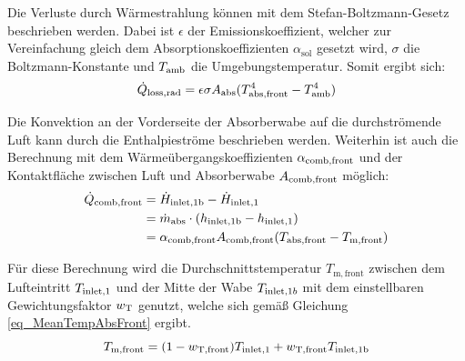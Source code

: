 Die Verluste durch Wärmestrahlung können mit dem Stefan-Boltzmann-Gesetz beschrieben werden.
Dabei ist $\epsilon$ der Emissionskoeffizient, welcher zur Vereinfachung gleich dem Absorptionskoeffizienten $\alpha_{\mathrm{sol}}$ gesetzt wird, $\sigma$ die Boltzmann-Konstante und $T_{\mathrm{amb}}$ die Umgebungstemperatur. Somit ergibt sich:
\begin{equation} \label{eq_StrahlungVerluste}
    \dot{Q}_{\mathrm{loss,rad}} = \epsilon \sigma A_{\mathrm{abs}} (T_{\mathrm{abs,front}}^4-T_{\mathrm{amb}}^4)
\end{equation}

Die Konvektion an der Vorderseite der Absorberwabe auf die durchströmende Luft kann durch die Enthalpieströme beschrieben werden.
Weiterhin ist auch die Berechnung mit dem Wärmeübergangskoeffizienten $\alpha_{\mathrm{comb},\mathrm{front}}$ und der Kontaktfläche zwischen Luft und Absorberwabe $A_{\mathrm{comb},\mathrm{front}}$ möglich:
\begin{equation} \label{eq_gewünschteKonvektion}
    \begin{aligned}
        \dot{Q}_{\mathrm{comb,front}} & = \dot{H}_{\mathrm{inlet,}\mathrm{1b}} - \dot{H}_{\mathrm{inlet,}1}                                              \\
                               & = \dot{m}_{\mathrm{abs}} \cdot ( h_{\mathrm{inlet,}\mathrm{1b}} - h_{\mathrm{inlet,}1})            \\
                               & = \alpha_{\mathrm{comb},\mathrm{front}} A_{\mathrm{comb},\mathrm{front}} (T_{\mathrm{abs,front}}-T_{\mathrm{m,front}})
    \end{aligned}
\end{equation}
 \pagebreak

Für diese Berechnung wird die Durchschnittstemperatur $T_{\mathrm{m,front}}$ zwischen dem Lufteintritt $T_{\mathrm{inlet,}1}$ und der Mitte der Wabe $T_{\mathrm{inlet,}1b}$ mit dem einstellbaren Gewichtungsfaktor $w_{\mathrm{T}}$ genutzt, welche sich gemäß Gleichung \ref{eq_MeanTempAbsFront} ergibt.
\begin{equation} \label{eq_MeanTempAbsFront}
    T_{\mathrm{m,front}} = (1-w_{\mathrm{T,front}}) T_{\mathrm{inlet,}1} + w_{\mathrm{T,front}} T_{\mathrm{inlet,}\mathrm{1b}}
\end{equation}

